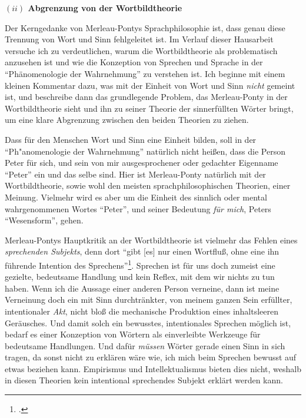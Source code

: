 \documentclass[a4paper, 12pt]{article}
\begin{document}
\begin{onehalfspace}
\vspace{5mm}

\noindent\textbf{$(ii)$ Abgrenzung von der Wortbildtheorie}

\noindent Der Kerngedanke von Merleau-Pontys Sprachphilosophie ist, dass genau diese Trennung von Wort und Sinn fehlgeleitet ist. Im Verlauf dieser Hausarbeit versuche ich zu verdeutlichen, warum die Wortbildtheorie als problematisch anzusehen ist und wie die Konzeption von Sprechen und Sprache in der "`Phänomenologie der Wahrnehmung"' zu verstehen ist. Ich beginne mit einem kleinen Kommentar dazu, was mit der Einheit von Wort und Sinn \emph{nicht} gemeint ist, und beschreibe dann das grundlegende Problem, das Merleau-Ponty in der Wortbildtheorie sieht und ihn zu seiner Theorie der sinnerfüllten Wörter bringt, um eine klare Abgrenzung zwischen den beiden Theorien zu ziehen.

Dass für den Menschen Wort und Sinn eine Einheit bilden, soll in der "`Ph"anomenologie der Wahrnehmung"' natürlich nicht heißen, dass die Person Peter für sich, und sein von mir ausgesprochener oder gedachter Eigenname "`Peter"' ein und das selbe sind. Hier ist Merleau-Ponty natürlich mit der Wortbildtheorie, sowie wohl den meisten sprachphilosophischen Theorien, einer Meinung. Vielmehr wird es aber um die Einheit des sinnlich oder mental wahrgenommenen Wortes "`Peter"', und seiner Bedeutung \emph{für mich}, Peters "`Wesensform"', gehen. 

Merleau-Pontys Hauptkritik an der Wortbildtheorie ist vielmehr das Fehlen eines \emph{sprechenden Subjekts}, denn dort "`gibt [es] nur einen Wortfluß, ohne eine ihn führende Intention des Sprechens"'\footnote{\Cite[Siehe][S. 208]{merleau1966phanomenologie}.}. Sprechen ist für uns doch zumeist eine gezielte, bedeutsame Handlung und kein Reflex, mit dem wir nichts zu tun haben. Wenn ich die Aussage einer anderen Person verneine, dann ist meine Verneinung doch ein mit Sinn durchtränkter, von meinem ganzen Sein erfüllter, intentionaler \emph{Akt}, nicht bloß die mechanische Produktion eines inhaltsleeren Geräusches. Und damit solch ein bewusstes, intentionales Sprechen möglich ist, bedarf es einer Konzeption von Wörtern als einverleibte Werkzeuge für bedeutsame Handlungen. Und dafür \emph{müssen} Wörter gerade einen Sinn in sich tragen, da sonst nicht zu erklären wäre wie, ich mich beim Sprechen bewusst auf etwas beziehen kann. Empirismus und Intellektualismus bieten dies nicht, weshalb in diesen Theorien kein intentional sprechendes Subjekt erklärt werden kann.


\end{onehalfspace}
\end{document}
